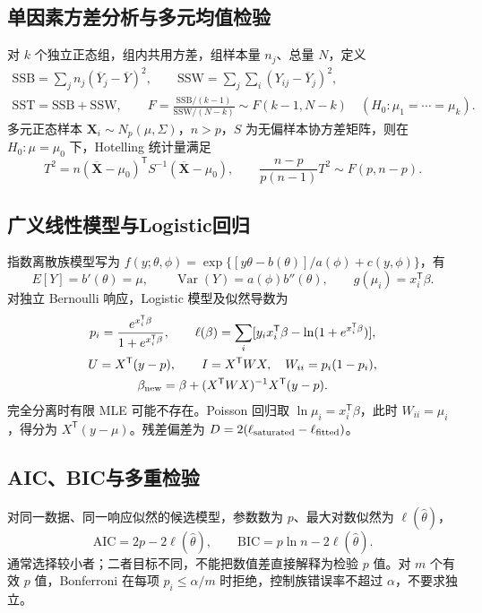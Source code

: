 \documentclass[../main.tex]{subfiles}
\begin{document}
\subsection{单因素方差分析与多元均值检验}
对 $k$ 个独立正态组，组内共用方差，组样本量 $n_j$、总量 $N$，定义
\begin{gather*}
\mathrm{SSB}=\sum_j n_j(\overline Y_j-\overline Y)^2,\qquad
\mathrm{SSW}=\sum_j\sum_i(Y_{ij}-\overline Y_j)^2,\\
\mathrm{SST}=\mathrm{SSB}+\mathrm{SSW},\qquad
F=\frac{\mathrm{SSB}/(k-1)}{\mathrm{SSW}/(N-k)}\sim F(k-1,N-k)
\quad(H_0:\mu_1=\cdots=\mu_k).
\end{gather*}
多元正态样本 $\bm X_i\sim N_p(\mu,\Sigma)$，$n>p$，$S$ 为无偏样本协方差矩阵，则在 $H_0:\mu=\mu_0$ 下，Hotelling 统计量满足
\[
T^2=n(\overline{\bm X}-\mu_0)^{\mathsf T}S^{-1}(\overline{\bm X}-\mu_0),\qquad
\frac{n-p}{p(n-1)}T^2\sim F(p,n-p).
\]

\subsection{广义线性模型与Logistic回归}
指数离散族模型写为 $f(y;\theta,\phi)=\exp\{[y\theta-b(\theta)]/a(\phi)+c(y,\phi)\}$，有
\[
E[Y]=b'(\theta)=\mu,\qquad\operatorname{Var}(Y)=a(\phi)b''(\theta),\qquad
g(\mu_i)=x_i^{\mathsf T}\beta.
\]
对独立 Bernoulli 响应，Logistic 模型及似然导数为
\begin{gather*}
p_i=\frac{e^{x_i^{\mathsf T}\beta}}{1+e^{x_i^{\mathsf T}\beta}},\qquad
\ell(\beta)=\sum_i[y_ix_i^{\mathsf T}\beta-\ln(1+e^{x_i^{\mathsf T}\beta})],\\
U=X^{\mathsf T}(y-p),\qquad I=X^{\mathsf T}WX,\quad W_{ii}=p_i(1-p_i),\\
\beta_{\rm new}=\beta+(X^{\mathsf T}WX)^{-1}X^{\mathsf T}(y-p).
\end{gather*}
完全分离时有限 MLE 可能不存在。Poisson 回归取 $\ln\mu_i=x_i^{\mathsf T}\beta$，此时 $W_{ii}=\mu_i$，得分为 $X^{\mathsf T}(y-\mu)$。残差偏差为 $D=2(\ell_{\rm saturated}-\ell_{\rm fitted})$。

\subsection{AIC、BIC与多重检验}
对同一数据、同一响应似然的候选模型，参数数为 $p$、最大对数似然为 $\ell(\widehat\theta)$，
\[
\mathrm{AIC}=2p-2\ell(\widehat\theta),\qquad
\mathrm{BIC}=p\ln n-2\ell(\widehat\theta).
\]
通常选择较小者；二者目标不同，不能把数值差直接解释为检验 $p$ 值。对 $m$ 个有效 $p$ 值，Bonferroni 在每项 $p_i\le\alpha/m$ 时拒绝，控制族错误率不超过 $\alpha$，不要求独立。
\end{document}
